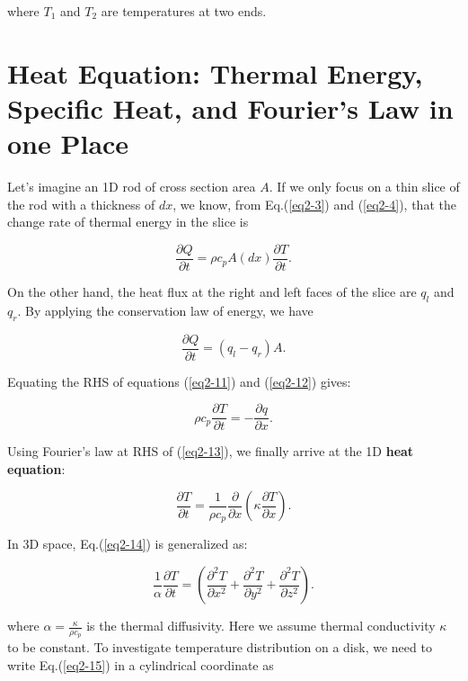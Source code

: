 where $T_1$ and $T_2$ are temperatures at two ends.

\section{Heat Equation: Thermal Energy, Specific Heat, and Fourier's Law in one Place}

Let's imagine an 1D rod of cross section area $A$. If we only focus on a thin slice of the rod with a thickness of $dx$, we know, from Eq.(\ref{eq2-3}) and (\ref{eq2-4}), that the change rate of thermal energy in the slice is 

\begin{equation}
    \frac{\partial Q}{\partial t}=\rho c_pA(dx)\frac{\partial T}{\partial t}.
    \label{eq2-11}
\end{equation}

On the other hand, the heat flux at the right and left faces of the slice are $q_l$ and $q_r$. By applying the conservation law of energy, we have

\begin{equation}
    \frac{\partial Q}{\partial t}=(q_l-q_r)A.
    \label{eq2-12}
\end{equation}

Equating the RHS of equations (\ref{eq2-11}) and (\ref{eq2-12}) gives:

\begin{equation}
    \rho c_p\frac{\partial T}{\partial t}=-\frac{\partial q}{\partial x}.
    \label{eq2-13}
\end{equation}

Using Fourier's law at RHS of (\ref{eq2-13}), we finally arrive at the 1D \textbf{heat equation}:

\begin{equation}
    \frac{\partial T}{\partial t}=\frac{1}{\rho c_p}\frac{\partial}{\partial x}\left(\kappa\frac{\partial T}{\partial x}\right).
    \label{eq2-14}
\end{equation}

In 3D space, Eq.(\ref{eq2-14}) is generalized as:

\begin{equation}
    \frac{1}{\alpha} \frac{\partial T}{\partial t}=\left(\frac{\partial^{2} T}{\partial x^{2}}+\frac{\partial^{2} T}{\partial y^{2}}+\frac{\partial^{2} T}{\partial z^{2}}\right).
    \label{eq2-15}
\end{equation}

where $\alpha=\frac{\kappa}{\rho c_p}$ is the thermal diffusivity. Here we assume thermal conductivity $\kappa$ to be constant. To investigate temperature distribution on a disk, we need to write Eq.(\ref{eq2-15}) in a cylindrical coordinate as

